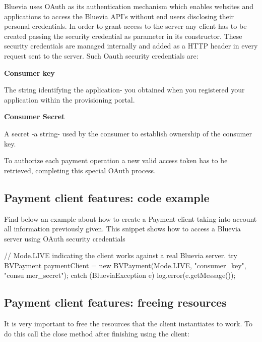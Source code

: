 Bluevia uses OAuth as its authentication mechanism which enables websites and applications to access the Bluevia API's without end users disclosing their personal credentials. In order to grant access to the server any client has to be created passing the security credential as parameter in its constructor. These security credentials are managed internally and added as a HTTP header in every request sent to the server. Such Oauth security credentials are:


\begin{DoxyItemize}
\item {\bfseries Consumer key} \par
The string identifying the application-\/ you obtained when you registered your application within the provisioning portal.


\item {\bfseries Consumer Secret} \par
A secret -\/a string-\/ used by the consumer to establish ownership of the consumer key. 
\end{DoxyItemize}

To authorize each payment operation a new valid access token has to be retrieved, completing this special OAuth process.\hypertarget{blv_payment_guide_paymentclient_features_code_example}{}\subsection{Payment client features: code example}\label{blv_payment_guide_paymentclient_features_code_example}
Find below an example about how to create a Payment client taking into account all information previously given. This snippet shows how to access a Bluevia server using OAuth security credentials


\begin{DoxyCode}
// Mode.LIVE indicating the client works against a real Bluevia server.
try {
        BVPayment paymentClient = new BVPayment(Mode.LIVE, "consumer_key", "consu
      mer_secret");
} catch (BlueviaException e){
        log.error(e.getMessage());
}
\end{DoxyCode}
\hypertarget{blv_payment_guide_paymentclient_features_freeing_resources_sec}{}\subsection{Payment client features: freeing resources}\label{blv_payment_guide_paymentclient_features_freeing_resources_sec}
It is very important to free the resources that the client instantiates to work. To do this call the close method after finishing using the client:


